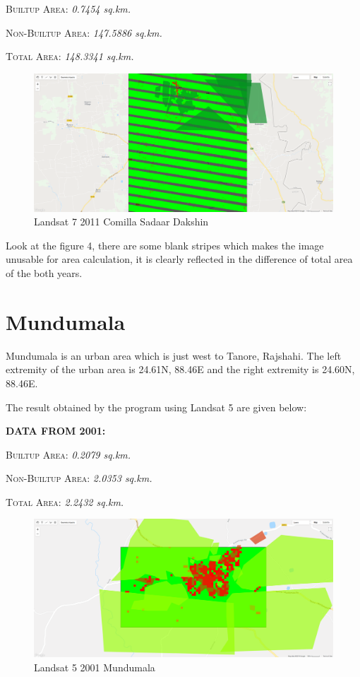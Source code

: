 \documentclass{article}
\begin{document}
\textsc{Builtup Area: } \textit{0.7454 sq.km.}

\textsc{Non-Builtup Area: } \textit{147.5886 sq.km.}

\textsc{Total Area: } \textit{148.3341 sq.km.}

\begin{figure}[H]
\centering
\includegraphics[width=\textwidth]{2011_ComillaSadaarDakshin_L7}
\caption{Landsat 7 2011 Comilla Sadaar Dakshin}
\end{figure}

Look at the figure 4, there are some blank stripes which makes the image unusable for area calculation, it is clearly reflected in the difference of total area of the both years.

\section{Mundumala}
Mundumala is an urban area which is just west to Tanore, Rajshahi. The left extremity of the urban area is 24.61\degree N, 88.46\degree E and the right extremity is 24.60\degree N, 88.46\degree E.

The result obtained by the program using \textsf{Landsat 5} are given below:

\textbf{DATA FROM 2001:}

\textsc{Builtup Area: } \textit{0.2079 sq.km.}

\textsc{Non-Builtup Area: } \textit{2.0353 sq.km.}

\textsc{Total Area: } \textit{2.2432 sq.km.}

\begin{figure}[H]
\centering
\includegraphics[width=\textwidth]{2001_Mundumala}
\caption{Landsat 5 2001 Mundumala}
\end{figure}
\end{document}
